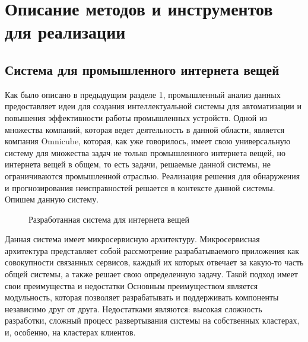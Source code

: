 \section{Описание методов и инструментов для реализации}

\subsection{Система для промышленного интернета вещей}

Как было описано в предыдущим разделе 1,
промышленный анализ данных предоставляет идеи для создания
интеллектуальной системы для автоматизации и повышения
эффективности работы промышленных устройств.
Одной из множества компаний, которая ведет деятельность в данной области,
является компания Omnicube, которая, как уже говорилось,
имеет свою универсальную систему для множества
задач не только промышленного интернета вещей,
но интернета вещей в общем, то есть задачи,
решаемые данной системы, не ограничиваются промышленной отраслью.
Реализация решения для обнаружения и прогнозирования
неисправностей решается в контексте данной системы.
Опишем данную систему.

\begin{figure}[h]
    \caption{Разработанная система для интернета вещей}
\end{figure}

Данная система имеет микросервисную архитектуру.
Микросервисная архитектура представляет собой рассмотрение
разрабатываемого приложения как совокупности связанных сервисов,
каждый их которых отвечает за какую-то часть общей системы,
а также решает свою определенную задачу.
Такой подход имеет свои преимущества и недостатки
Основным преимуществом является модульность,
которая позволяет разрабатывать и поддерживать
компоненты независимо друг от друга.
Недостатками являются:
высокая сложность разработки,
сложный процесс развертывания системы
на собственных кластерах,
и, особенно, на кластерах клиентов.

